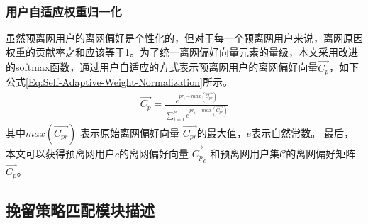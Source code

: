 \subsubsection{用户自适应权重归一化}
虽然预离网用户的离网偏好是个性化的，但对于每一个预离网用户来说，离网原因权重的贡献率之和应该等于1。为了统一离网偏好向量元素的量级，本文采用改进的softmax函数，通过用户自适应的方式表示预离网用户的离网偏好向量$\overrightarrow{C_{p}}$，如下公式\ref{Eq:Self-Adaptive-Weight-Normalization}所示。
\begin{equation}
	\begin{aligned}
		\overrightarrow{C_{p}}  = \frac{e^{pr_{i}-max(\overrightarrow{C_{pr}})}}{\sum_{i=1}^{n} e^{pr_{i}-max(\overrightarrow{C_{pr}})}}
	\end{aligned}
	\label{Eq:Self-Adaptive-Weight-Normalization}
\end{equation}	
其中$max(\overrightarrow{C_{pr}})$ 表示原始离网偏好向量 $\overrightarrow{C_{pr}}$的最大值，$e$表示自然常数。 最后，本文可以获得预离网用户$c$的离网偏好向量 $\overrightarrow{C_{p}}_c$ 和预离网用户集$\mathcal{C}$的离网偏好矩阵$\overrightarrow{C_{p}}$。
\par



\subsection{挽留策略匹配模块描述}

